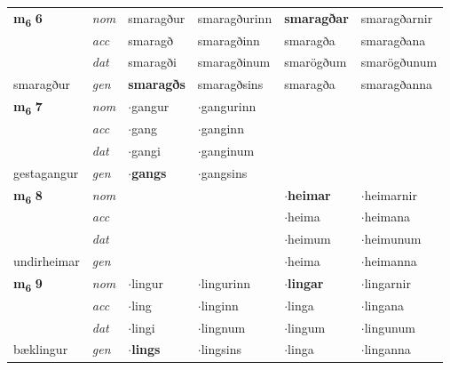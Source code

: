 \begin{longtable}[l]{llllll}
\multirow{3}{*}{{{\textbf{m{\textsubscript{6}}} \Large{\textbf{6}}}}}  & {\footnotesize{{\textit{nom}}}} & smaragður & smaragðurinn    & \textbf{smaragðar} & smaragðarnir  \\*
 &  {\footnotesize{{\textit{acc}}}} & smaragð  & smaragðinn   & smaragða  & smaragðana \\*
 &  {\footnotesize{{\textit{dat}}}} & smaragði & smaragðinum   & smarögðum & smarögðunum \\*
 {\footnotesize{smaragður}} &   {\footnotesize{{\textit{gen}}}} & \textbf{smaragðs}  & smaragðsins  & smaragða & smaragðanna \\
\cmidrule{1-6}


\multirow{3}{*}{{{\textbf{m{\textsubscript{6}}} \Large{\textbf{7}}}}}  & {\footnotesize{{\textit{nom}}}} & $\cdot$gangur & $\cdot$gangurinn    & \textbf{} &   \\*
 &  {\footnotesize{{\textit{acc}}}} & $\cdot$gang  & $\cdot$ganginn   &   &  \\*
 &  {\footnotesize{{\textit{dat}}}} & $\cdot$gangi & $\cdot$ganginum   &  &  \\*
 {\footnotesize{gestagangur}} &   {\footnotesize{{\textit{gen}}}} & \textbf{$\cdot$gangs}  & $\cdot$gangsins  &  &  \\
\cmidrule{1-6}


\multirow{3}{*}{{{\textbf{m{\textsubscript{6}}} \Large{\textbf{8}}}}}  & {\footnotesize{{\textit{nom}}}} &  &     & \textbf{$\cdot$heimar} & $\cdot$heimarnir  \\*
 &  {\footnotesize{{\textit{acc}}}} &   &    & $\cdot$heima  & $\cdot$heimana \\*
 &  {\footnotesize{{\textit{dat}}}} &  &    & $\cdot$heimum & $\cdot$heimunum \\*
 {\footnotesize{undirheimar}} &   {\footnotesize{{\textit{gen}}}} & \textbf{}  &   & $\cdot$heima & $\cdot$heimanna \\
\cmidrule{1-6}


\multirow{3}{*}{{{\textbf{m{\textsubscript{6}}} \Large{\textbf{9}}}}}  & {\footnotesize{{\textit{nom}}}} & $\cdot$lingur & $\cdot$lingurinn    & \textbf{$\cdot$lingar} & $\cdot$lingarnir  \\*
 &  {\footnotesize{{\textit{acc}}}} & $\cdot$ling  & $\cdot$linginn   & $\cdot$linga  & $\cdot$lingana \\*
 &  {\footnotesize{{\textit{dat}}}} & $\cdot$lingi & $\cdot$lingnum   & $\cdot$lingum & $\cdot$lingunum \\*
 {\footnotesize{bæklingur}} &   {\footnotesize{{\textit{gen}}}} & \textbf{$\cdot$lings}  & $\cdot$lingsins  & $\cdot$linga & $\cdot$linganna \\
\cmidrule{1-6}



\end{longtable}
